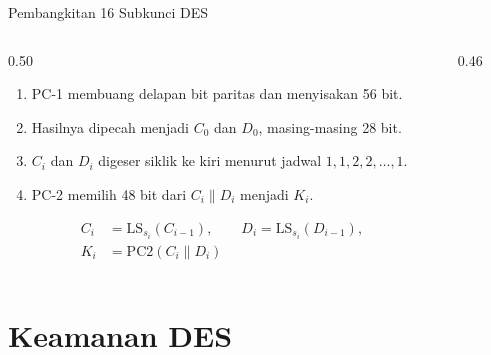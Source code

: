 \documentclass[aspectratio=169,11pt]{beamer}
\begin{document}
\begin{frame}{Pembangkitan 16 Subkunci DES}
    \begin{columns}[T,onlytextwidth]
        \begin{column}{0.50\textwidth}
            \footnotesize
            \begin{enumerate}
                \item PC-1 membuang delapan bit paritas dan menyisakan
                      56 bit.
                \item Hasilnya dipecah menjadi $C_0$ dan $D_0$, masing-masing
                      28 bit.
                \item $C_i$ dan $D_i$ digeser siklik ke kiri menurut
                      jadwal $1,1,2,2,\dots,1$.
                \item PC-2 memilih 48 bit dari $C_i\parallel D_i$
                      menjadi $K_i$.
            \end{enumerate}
            \[
                \begin{aligned}
                    C_i&=\mathrm{LS}_{s_i}(C_{i-1}), \qquad
                    D_i=\mathrm{LS}_{s_i}(D_{i-1}),\\
                    K_i&=\mathrm{PC2}(C_i\parallel D_i)
                \end{aligned}
            \]
        \end{column}
        \begin{column}{0.46\textwidth}
            \begin{center}
            \end{center}
        \end{column}
    \end{columns}
\end{frame}

\section{Keamanan DES}
\end{document}
